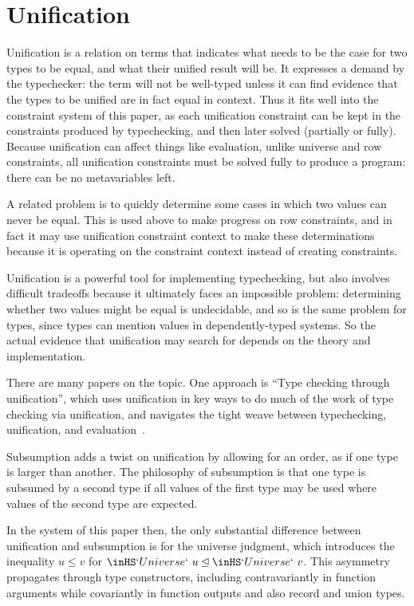 \documentclass[11pt, twoside, reqno]{book}
\newcommand{\subsumedBy}{\unlhd}
\begin{document}
\chapter{Unification}
Unification is a relation on terms that indicates what needs to be the case for two types to be equal, and what their unified result will be.
It expresses a demand by the typechecker: the term will not be well-typed unless it can find evidence that the types to be unified are in fact equal in context.
Thus it fits well into the constraint system of this paper, as each unification constraint can be kept in the constraints produced by typechecking, and then later solved (partially or fully).
Because unification can affect things like evaluation, unlike universe and row constraints, all unification constraints must be solved fully to produce a program: there can be no metavariables left.

A related problem is to quickly determine some cases in which two values can never be equal.
This is used above to make progress on row constraints, and in fact it may use unification constraint context to make these determinations because it is operating on the constraint context instead of creating constraints.

Unification is a powerful tool for implementing typechecking, but also involves difficult tradeoffs because it ultimately faces an impossible problem: determining whether two values might be equal is undecidable, and so is the same problem for types, since types can mention values in dependently-typed systems.
So the actual evidence that unification may search for depends on the theory and implementation.

There are many papers on the topic.
One approach is ``Type checking through unification'', which uses unification in key ways to do much of the work of type checking via unification, and navigates the tight weave between typechecking, unification, and evaluation~\cite{mazzoli_abel_2016}.

Subsumption adds a twist on unification by allowing for an order, as if one type is larger than another.
The philosophy of subsumption is that one type is subsumed by a second type if all values of the first type may be used where values of the second type are expected.

In the system of this paper then, the only substantial difference between unification and subsumption is for the universe judgment, which introduces the inequality \(u \le v\) for \(\inHS`Universe`\ u \subsumedBy \inHS`Universe`\ v\).
This asymmetry propagates through type constructors, including contravariantly in function arguments while covariantly in function outputs and also record and union types.
\end{document}
